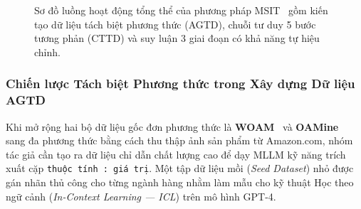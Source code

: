 \documentclass[conference,10pt]{IEEEtran}
\begin{document}
\begin{figure}[!t]
\caption{Sơ đồ luồng hoạt động tổng thể của phương pháp MSIT~\cite{li2025msit} gồm kiến tạo dữ liệu tách biệt phương thức (AGTD), chuỗi tư duy 5 bước tương phản (CTTD) và suy luận 3 giai đoạn có khả năng tự hiệu chỉnh.}
\label{fig:msit_pipeline}
\end{figure}

\subsubsection{Chiến lược Tách biệt Phương thức trong Xây dựng Dữ liệu AGTD}

Khi mở rộng hai bộ dữ liệu gốc đơn phương thức là \textbf{WOAM}~\cite{xu2023amacer} và \textbf{OAMine}~\cite{zhang2022oamine} sang đa phương thức bằng cách thu thập ảnh sản phẩm từ Amazon.com, nhóm tác giả cần tạo ra dữ liệu chỉ dẫn chất lượng cao để dạy MLLM kỹ năng trích xuất cặp \texttt{thuộc tính : giá trị}. Một tập dữ liệu mồi (\textit{Seed Dataset}) nhỏ được gán nhãn thủ công cho từng ngành hàng nhằm làm mẫu cho kỹ thuật Học theo ngữ cảnh (\textit{In-Context Learning --- ICL}) trên mô hình GPT-4.
\end{document}
